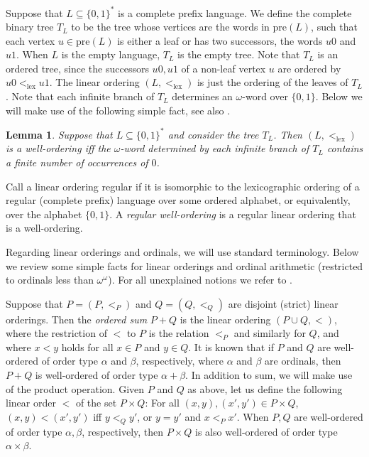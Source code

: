 \documentclass[copyright]{eptcs}
\newtheorem{lemma}[theorem]{\bf Lemma}        \newtheorem{sublemma}[theorem]{\bf Sublemma}	\newtheorem{proposition}[theorem]{\bf Proposition}  \newtheorem{corollary}[theorem]{\bf Corollary}
\newcommand{\zo}{\{0,1\}}
\newcommand{\zos}{\{0,1\}^*}
\newcommand{\lex}{<_{\mathrm{lex}}}
\newcommand{\pre}{\mathrm{pre}}
\begin{document}
Suppose that $L\subseteq \zos$ is a complete prefix language.
We define the complete binary tree $T_L$ to be the tree whose 
vertices are the words in $\pre(L)$, 
such that each vertex $u\in \pre(L)$ is either a leaf or has 
two successors, the words $u0$ and $u1$. When $L$ is the 
empty language, $T_L$ is the empty tree. Note that $T_L$ 
is an ordered tree, since the successors $u0,u1$ 
of a non-leaf vertex $u$ are ordered by $u0 \lex u1$. 
The linear ordering $(L,\lex)$ is just the ordering 
of the leaves of $T_L$. Note that each infinite branch
of $T_L$ determines an $\omega$-word over $\{0,1\}$. 
Below we will make use of the following 
simple fact, see also \cite{Carayoletal}. 

\begin{lemma}
\label{lem-intro}
Suppose that $L \subseteq \zos$ and consider the tree $T_L$.
Then $(L,\lex)$ is a well-ordering iff the $\omega$-word 
determined by each infinite branch of $T_L$ contains a 
finite number of occurrences of $0$.
\end{lemma}


Call a linear ordering regular if it is isomorphic to the 
lexicographic ordering of a regular (complete prefix) language over some 
ordered alphabet, or equivalently, over the alphabet $\zo$.
A \emph{regular well-ordering} is a regular linear ordering that is 
a well-ordering. 

Regarding linear orderings and ordinals, we will use standard 
terminology. Below we review some simple facts for 
linear orderings and ordinal arithmetic
(restricted to ordinals less than $\omega^\omega$). For all 
unexplained notions we refer to \cite{Rosenstein}.

Suppose that $P = (P,<_P)$ and $Q= (Q,<_Q)$ are disjoint 
(strict) linear orderings.  
Then the \emph{ordered sum} $P + Q$ is the linear ordering 
$(P \cup Q, <)$, where the restriction of $<$ to $P$ is the relation $<_P$
and similarly for $Q$, and where $x < y$ holds for all $x \in P$ and $y \in Q$.
It is known that if $P$ and $Q$ are well-ordered of order type
$\alpha$ and $\beta$, respectively, where $\alpha$ and $\beta$ are ordinals, 
then $P+Q$ is well-ordered of order type $\alpha + \beta$. 
In addition to sum, we will make use of the product operation. 
Given $P$ and $Q$ as above, let us define the following 
linear order $<$ of the set $P \times Q$: For all $(x,y),(x',y') \in P \times Q$, 
$(x,y) < (x',y')$ iff $y <_Q y'$, or $y = y'$ and $x<_P x'$. 
When $P,Q$ are well-ordered of order type $\alpha,\beta$, respectively, then 
$P \times Q$ is also well-ordered of order type $\alpha \times \beta$. 
\end{document}
